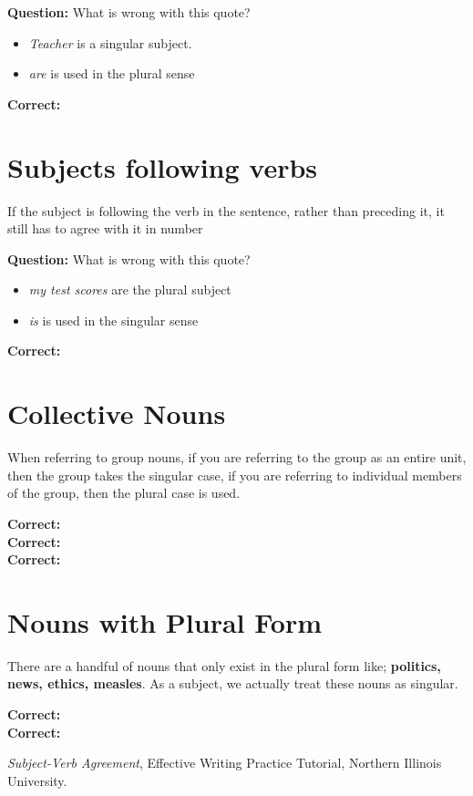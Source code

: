 \documentclass[12pt]{article} %
\begin{document}

\textbf{Question:} What is wrong with this quote?
\begin{itemize}
  \item \textit{Teacher} is a singular subject.
  \item \textit{are} is used in the plural sense
\end{itemize}

\textbf{Correct:} 

\section{Subjects following verbs}
If the subject is following the verb in the sentence, rather than preceding it,
it still has to agree with it in number


\textbf{Question:} What is wrong with this quote?
\begin{itemize}
  \item \textit{my test scores} are the plural subject
  \item \textit{is} is used in the singular sense
\end{itemize}

\textbf{Correct:} 

\section{Collective Nouns}
When referring to group nouns, if you are referring to the group as an entire unit, then the group takes the singular 
case, if you are referring to individual members of the group, then the plural case is used.

\textbf{Correct:} \\
\textbf{Correct:} \\
\textbf{Correct:} 

\newpage

\section{Nouns with Plural Form}
There are a handful of nouns that only exist in the plural form like; \textbf{politics, news, ethics, measles}. As a subject,
we actually treat these nouns as singular.

\textbf{Correct:}   \\
\textbf{Correct:}   


\textit{Subject-Verb Agreement}, Effective Writing Practice Tutorial, Northern Illinois University.\\


  
\end{document}
